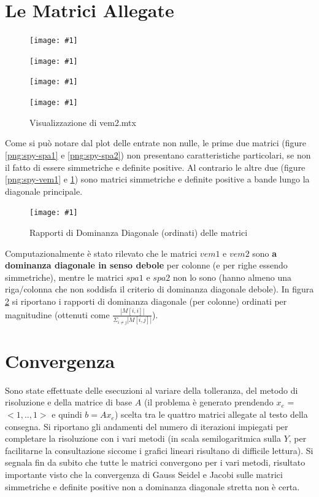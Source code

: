 \documentclass[a4paper,11pt,oneside, table]{article}
\newcommand{\putimage}[4] {
	\begin{figure}[H]
	    \centering
	    \texttt{[image: \#1]}
	    \caption{#2}\label{#3}
	\end{figure}
}
\newcommand{\putsubimage}[5] {
  \begin{minipage}{{#4}\linewidth}
	    \centering
      \texttt{[image: \#1]}
	    \caption{#2}\label{#3}
	\end{minipage}
}
\newcommand{\putimagequadruple}[4] {
  \begin{figure}[!htb]
      \centering
      #1
      \hspace{0.5cm}
      #2
      \linebreak
      #3
      \hspace{0.5cm}
      #4
  \end{figure}
}
\begin{document}
\pagebreak

\section{Le Matrici Allegate}

\putimagequadruple
  {\putsubimage{./images/spy-spa1.png}{Visualizzazione di spa1.mtx}{png:spy-spa1}{0.4}{0.99}}
  {\putsubimage{./images/spy-spa2.png}{Visualizzazione di spa2.mtx}{png:spy-spa2}{0.4}{0.99}}
  {\putsubimage{./images/spy-vem1.png}{Visualizzazione di vem1.mtx}{png:spy-vem1}{0.4}{0.99}}
  {\putsubimage{./images/spy-vem2.png}{Visualizzazione di vem2.mtx}{png:spy-vem2}{0.4}{0.99}}

Come si pu\`o notare dal plot delle entrate non nulle, le prime due matrici (figure \ref{png:spy-spa1} e \ref{png:spy-spa2}) non presentano caratteristiche particolari, se non il fatto di essere simmetriche e definite positive.
Al contrario le altre due (figure \ref{png:spy-vem1} e \ref{png:spy-vem2}) sono matrici simmetriche e definite positive a bande lungo la diagonale principale.

\putimage{./images/dominance.png}{Rapporti di Dominanza Diagonale (ordinati) delle matrici}{png:dominance}{0.9}

Computazionalmente \`e stato rilevato che le matrici $vem1$ e $vem2$ sono \textbf{a dominanza diagonale in senso debole} per colonne (e per righe essendo simmetriche), mentre le matrici $spa1$ e $spa2$ non lo sono (hanno almeno una riga/colonna che non soddisfa il criterio di dominanza diagonale debole).
In figura \ref{png:dominance} si riportano i rapporti di dominanza diagonale (per colonne) ordinati per magnitudine (ottenuti come $\frac {| M[i, i] |} {\Sigma _ {i \ne j} | M[i, j] |}$).

\section{Convergenza}

Sono state effettuate delle esecuzioni al variare della tolleranza, del metodo di risoluzione e della matrice di base $A$ (il problema \`e generato prendendo $x_e$ = $<1,.., 1>$ e quindi $b = Ax_e$) scelta tra le quattro matrici allegate al testo della consegna.
Si riportano gli andamenti del numero di iterazioni impiegati per completare la risoluzione con i vari metodi (in scala semilogaritmica sulla $Y$, per facilitarne la consultazione siccome i grafici lineari risultano di difficile lettura).
Si segnala fin da subito che tutte le matrici convergono per i vari metodi, risultato importante visto che la convergenza di Gauss Seidel e Jacobi sulle matrici simmetriche e definite positive non a dominanza diagonale stretta non \`e certa.
\end{document}
